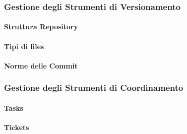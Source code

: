 \subsubsection{Gestione degli Strumenti di Versionamento}

\paragraph{Struttura Repository}

\paragraph{Tipi di files}

\paragraph{Norme delle Commit}


\subsubsection{Gestione degli Strumenti di Coordinamento}

\paragraph{Tasks}

\paragraph{Tickets}
